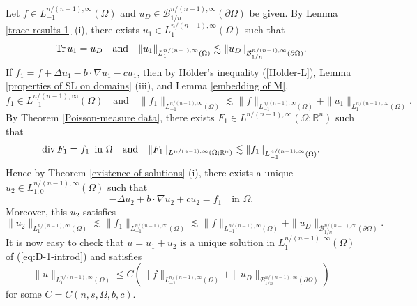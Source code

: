 \documentclass[reqno,centertags,11pt]{amsart}
\theoremstyle{definition}
\numberwithin{thm}{section}
\numberwithin{equation}{section}
\newcommand{\R}{{\mathbb{R}}}
\begin{document}
Let $f \in L_{-1}^{n/(n-1),\infty}(\Omega )$ and $u_D \in \mathcal B^{n/(n-1),\infty}_{1/n}(\partial \Omega )$ be given. By Lemma \ref{trace results-1} (i), there exists  $u_1 \in L_{1}^{n/(n-1),\infty}(\Omega )$ such that
\[
{\rm Tr}\, u_1 = u_D \quad\mbox{and}\quad \|u_1 \|_{L_{1}^{n/(n-1),\infty}(\Omega )} \lesssim  \|u_D \|_{\mathcal B^{n/(n-1),\infty}_{1/n}(\partial \Omega )}.
\]
If $f_1 = f+  \Delta u_1 -b\cdot \nabla u_1 -cu_1$, then by H\"{o}lder's    inequality (\ref{Holder-L}), Lemma \ref{properties of SL on domains} (iii), and Lemma \ref{embedding of M},
\[
f_1 \in L_{-1}^{n/(n-1),\infty}(\Omega )\quad\mbox{and}\quad \|f_1 \|_{L_{-1}^{n/(n-1),\infty}(\Omega )} \lesssim   \|f\|_{L_{-1}^{n/(n-1),\infty}(\Omega )} + \|u_1 \|_{L_{1}^{n/(n-1),\infty}(\Omega )}  .
\]
By Theorem \ref{Poisson-measure data}, there exists  $F_1 \in L^{n/(n-1),\infty}(\Omega; \R^n )$  such that
\[
{\rm div}\, F_1 = f_1 \,\,\,\mbox{in}\,\,\Omega \quad\mbox{and}\quad \|F_1 \|_{L^{n/(n-1),\infty}(\Omega; \R^n )}   \lesssim\|f_1 \|_{L_{-1}^{n/(n-1),\infty}(\Omega )}.
\]
Hence by Theorem \ref{existence of solutions} (i),
there exists a unique   $u_2 \in L_{1, 0}^{n/(n-1),\infty}(\Omega )$ such that
\[
- \Delta u_2 + b \cdot \nabla u_2 +cu_2   = f_1   \quad   \text{in }\Omega.
\]
Moreover, this $u_2$ satisfies
\[
\|u_2 \|_{L_1^{n/(n-1),\infty}(\Omega  )} \lesssim  \|f_1 \|_{L_{-1}^{n/(n-1),\infty}(\Omega )} \lesssim \|f \|_{L_{-1}^{n/(n-1),\infty}(\Omega )} + \|u_D \|_{\mathcal B^{n/(n-1),\infty}_{1/n}(\partial \Omega )} .
\]
It is now easy to check that $u= u_1 +u_2$ is a unique solution in $ L_{1}^{n/(n-1),\infty}(\Omega )$ of (\ref{eq:D-1-introd}) and  satisfies
\[
   \|   u \|_{L_{1}^{n/(n-1),\infty}(\Omega )}  \le C \left( \|f \|_{L_{-1}^{n/(n-1),\infty}(\Omega )} + \|u_D \|_{\mathcal B^{n/(n-1),\infty}_{1/n}(\partial \Omega )} \right)
\]
for some $C=C(n,  s, \Omega ,b,c )$.
\end{document}
